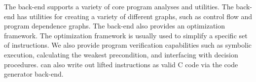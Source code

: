 The \bap back-end supports a variety of core program analyses
and utilities.  The back-end has utilities for creating a variety of
different graphs, such as control flow and program dependence graphs.
The back-end also provides an optimization framework. The optimization
framework is usually used to simplify a specific set of
instructions. We also provide program verification capabilities such
as symbolic execution, calculating the weakest precondition, and
interfacing with decision procedures.  \bap can also write out lifted
\bap instructions as valid C code via the code generator back-end.

